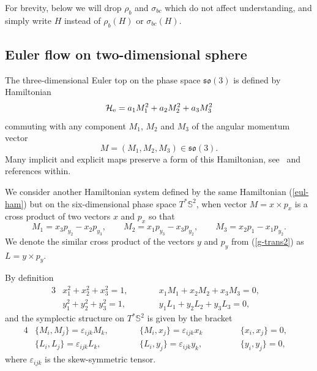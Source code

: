 \documentclass[10pt,a4paper]{amsart}
\numberwithin{equation}{section}
\begin{document}
For brevity, below we will drop $\rho_b$ and $\sigma_{bc}$ which do not affect understanding, and simply write $H$ instead of $\rho_b(H)$ or $\sigma_{bc}(H)$.

\subsection{Euler flow on two-dimensional sphere}
The three-dimensional Euler top on the phase space $\mathfrak{so}(3)$ is defined by Hamiltonian
\begin{equation}\label{eul-ham}
\mathcal H_{\rm e}=a_1M_1^2+a_2M_2^2+a_3M_3^2
\end{equation}
commuting with any component $M_1$, $M_2$ and $M_3$ of the angular momentum vector
\[M=(M_1,M_2,M_3)\in \mathfrak{so}(3).\]
Many implicit and explicit maps preserve a form of this Hamiltonian, see~\cite{ts18e} and references within.

We consider another Hamiltonian system defined by the same Hamiltonian (\ref{eul-ham}) but on the six-dimensional phase space $T^*\mathbb S^2$, when
vector $M=x\times p_{x}$ is a cross product of two vectors $x$ and $p_x$ so that
\[
M_1=x_3p_{y_2}-x_2p_{y_3} ,\qquad M_2=x_1p_{y_3}-x_3p_{y_2} ,\qquad M_3=x_2p_1-x_1p_{y_2}.
\]
We denote the similar cross product of the vectors $y$ and $p_y$ from (\ref{g-trans2}) as $L=y\times p_y$.

By definition
\begin{alignat}{3}
& x_1^2+x_2^2+x_3^2=1 , \qquad && x_1M_1+x_2M_2+x_3M_3=0 ,&\nonumber\\
\label{caz2}
 & y_1^2+y_2^2+y_3^2=1 ,\qquad && y_1L_1+y_2L_2+y_3L_3=0 ,&
\end{alignat}
and the symplectic structure on $T^*\mathbb S^2$ is given by the bracket
\begin{alignat}{4}
& \{M_{i}, M_{j}\}=\varepsilon_{ijk}M_{k} , \qquad&&
\{M_{i}, x_{j}\} =\varepsilon_{ijk}x_{k}   \qquad&&
&\{x_{i},x_{j}\}=0 , &\nonumber\\
\label{e3}
& \{L_{i}, L_{j}\}=\varepsilon_{ijk}L_{k} ,  \qquad&&
\{L_{i}, y_{j}\} =\varepsilon_{ijk}y_{k} ,  \quad&&
&\{y_{i},y_{j}\}=0 ,&
\end{alignat}
where $\varepsilon_{ijk}$ is the skew-symmetric tensor.
\end{document}
